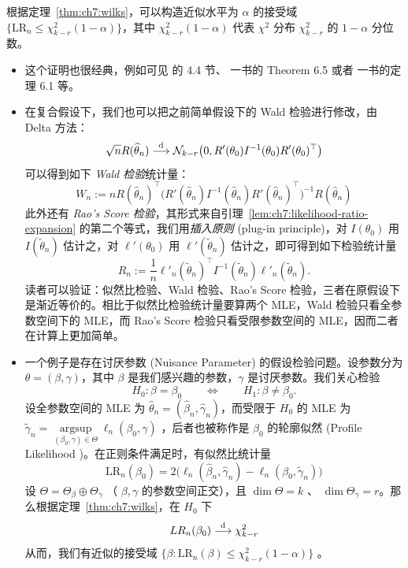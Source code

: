 根据定理~\ref{thm:ch7:wilks}，可以构造近似水平为 $\alpha$ 的接受域 $\{\mathrm{LR}_n\le \chi^2_{k-r}(1-\alpha)\}$，其中 $\chi^2_{k-r}(1-\alpha)$ 代表 $\chi^2$ 分布 $\chi^2_{k-r}$ 的 $1-\alpha$ 分位数。

\begin{remark}

\begin{itemize}
\tightlist
\item
  这个证明也很经典，例如可见 \cite{serfling1980} 的 4.4 节、\cite{shao2003} 一书的 Theorem 6.5 或者 \cite{chenxiru2009} 一书的定理 6.1 等。
\item
  在复合假设下，我们也可以把之前简单假设下的 Wald 检验进行修改，由 Delta 方法： \[ \sqrt nR(\widehat\theta_n)\overset{\rm d }\longrightarrow\mathcal N_{k-r}\big(0,R'(\theta_0)I^{-1}(\theta_0)R'(\theta_0)^\top\big) \]可以得到如下 \emph{Wald 检验}统计量： \[ W_n:=nR(\widehat\theta_n)^\top\big(R'(\widehat\theta_n)I^{-1}(\widehat\theta_n)R'(\widehat\theta_n)^\top\big)^{-1}R(\widehat\theta_n) \]此外还有 \emph{Rao's Score 检验}，其形式来自引理~\ref{lem:ch7:likelihood-ratio-expansion} 的第二个等式，我们用\emph{插入原则} (plug-in principle)，对 $I(\theta_0)$ 用 $I(\widetilde\theta_n)$ 估计之，对 $\ell'(\theta_0)$ 用 $\ell'(\widetilde\theta_n)$ 估计之，即可得到如下检验统计量
  \[
  R_n:=\frac1n\ell'_n(\widetilde\theta_n)^\top
  I^{-1}(\widetilde\theta_n)\ell'_n(\widetilde\theta_n).
  \]
  读者可以验证：似然比检验、Wald 检验、Rao's Score 检验，三者在原假设下是渐近等价的。相比于似然比检验统计量要算两个 MLE，Wald 检验只看全参数空间下的 MLE，而 Rao's Score 检验只看受限参数空间的 MLE，因而二者在计算上更加简单。
\item
  一个例子是存在讨厌参数 (Nuisance Parameter) 的假设检验问题。设参数分为 $\theta = (\beta, \gamma)$，其中 $\beta$ 是我们感兴趣的参数，$\gamma$ 是讨厌参数。我们关心检验
  \[
  H_0:\beta=\beta_0
  \qquad\Leftrightarrow\qquad
  H_1:\beta\ne\beta_0.
  \]
  设全参数空间的 MLE 为 $\widehat\theta_n = (\widehat\beta_n, \widehat\gamma_n)$，而受限于 $H_0$ 的 MLE 为 $\widetilde\gamma_n = \operatorname*{\arg\sup}\limits_{(\beta_0,\gamma)\in\Theta} \ell_n(\beta_0,\gamma)$ ，后者也被称作是 $\beta_0$ 的轮廓似然 (Profile Likelihood
  )。在正则条件满足时，有似然比统计量\[ \mathrm{LR}_n(\beta_0) = 2\bigl( \ell_n(\widehat\beta_n, \widehat\gamma_n) - \ell_n(\beta_0, \widetilde\gamma_n) \bigr) \]设 $\Theta = \Theta_\beta \oplus \Theta_\gamma$ （ $\beta,\gamma$ 的参数空间正交），且 $\dim\Theta=k$ 、 $\dim\Theta_\gamma = r$。那么根据定理~\ref{thm:ch7:wilks}，在 $H_0$ 下\[ LR_n(\beta_0) \overset{\rm d}\longrightarrow \chi^2_{k-r} \]从而，我们有近似的接受域 $\{\beta:\mathrm{LR}_n(\beta)\le \chi^2_{k-r}(1-\alpha)\}$ 。
\end{itemize}
\end{remark}

